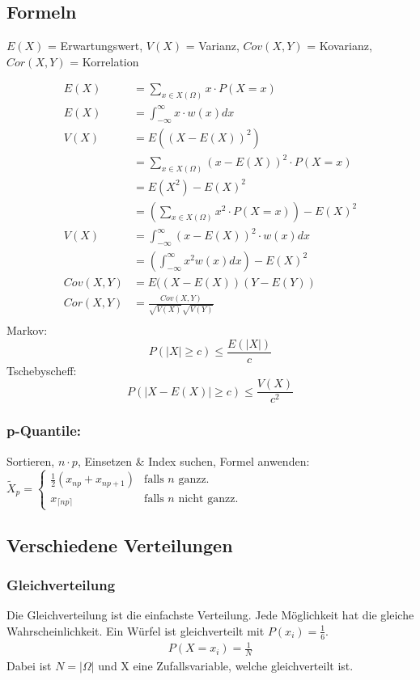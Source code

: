 \documentclass[a4paper, 8pt, landscape]{extarticle}
\let\oldint\int
\renewcommand{\int}{\ensuremath{\textstyle\oldint}}
\let\oldsum\sum
\renewcommand{\sum}{\ensuremath{\textstyle\oldsum}}
\begin{document}
\begin{multicols*}{5}
	    \subsection{Formeln}
		    $E(X)$ = Erwartungswert,
		    $V(X)$ = Varianz,
		    $Cov(X,Y)$ = Kovarianz,
		    $Cor(X,Y)$ = Korrelation
		    
		    \begin{align*}
		    	E(X) &= \sum_{x \in X(\Omega)} x \cdot P(X = x)\\
		    	E(X) &= \int_{-\infty}^{\infty} x \cdot w(x) dx\\
		    	V(X) &= E((X-E(X))^2)\\
		    	&= \sum_{x \in X(\Omega)} (x - E(X))^2 \cdot P(X = x)\\
		    	&= E(X^2)-E(X)^2\\
			    &= \left(\sum_{x \in X(\Omega)} x^2 \cdot P(X = x)\right) - E(X)^2\\
		    	V(X) &= \int_{-\infty}^{\infty} (x - E(X))^2 \cdot w(x) dx\\
		    	&= \left(\int_{-\infty}^{\infty} x^2 w(x) dx \right) - E(X)^2	\\
		    	Cov(X,Y)&=E((X-E(X))(Y-E(Y))\\
		    	Cor(X,Y)&=\frac{Cov(X,Y)}{\sqrt{V(X)}\sqrt{V(Y)}}\\
		    \end{align*}
		    Markov: $$P(|X|\geq c) \leq \frac{E(|X|)}{c}$$
		    Tschebyscheff:$$P(|X-E(X)|\geq c)\leq\frac{V(X)}{c^2}$$
		    \subsubsection{p-Quantile:}
		    Sortieren, $n\cdot p$, Einsetzen \& Index suchen, Formel anwenden:\\
			$\widetilde{X}_p=
			\begin{cases}
			\frac{1}{2}(x_{np}+x_{np+1}) & \text{falls } n \text{ ganzz.}\\
			x_{\lceil{np}\rceil} & \text{falls } n \text{ nicht ganzz.}
			\end{cases}$
	    \subsection{Verschiedene Verteilungen}
			\subsubsection{Gleichverteilung}
				Die Gleichverteilung ist die einfachste Verteilung. Jede Möglichkeit hat die gleiche Wahrscheinlichkeit. Ein Würfel ist gleichverteilt mit $P(x_i) = \frac{1}{6}$.\\
				\begin{align*}
					P(X = x_i) = \frac{1}{N}
				\end{align*}
				Dabei ist $N = |\Omega|$ und X eine Zufallsvariable, welche gleichverteilt ist.

\end{multicols*}
\end{document}
